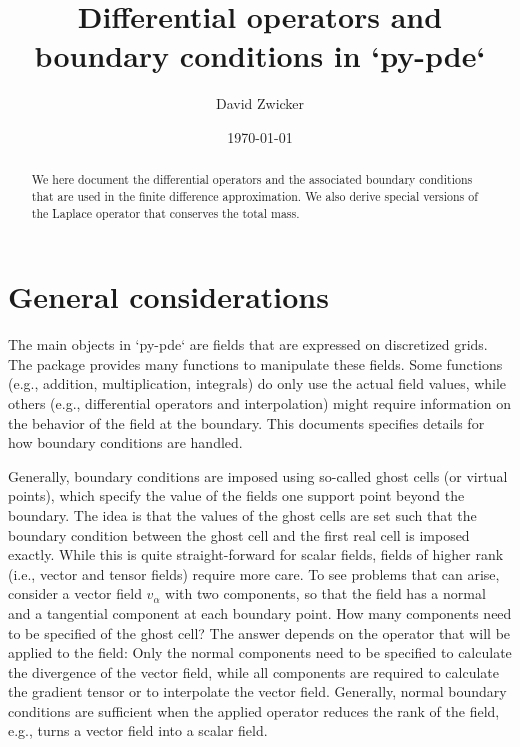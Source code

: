 \documentclass[
	superscriptaddress,
	twocolumn,
	aps, pre
]{revtex4-1}
\begin{document}
\title{Differential operators and boundary conditions in `py-pde`}
\author{David Zwicker}
\date{\today}

\begin{abstract}
We here document the differential operators and the associated boundary conditions that are used in the finite difference approximation.
We also derive special versions of the Laplace operator that conserves the total mass.
\end{abstract}


\maketitle
\tableofcontents


\section{General considerations}
The main objects in `py-pde` are fields that are expressed on discretized grids.
The package provides many functions to manipulate these fields.
Some functions (e.g., addition, multiplication, integrals) do only use the actual field values, while others (e.g., differential operators and interpolation) might require information on the behavior of the field at the boundary.
This documents specifies details for how boundary conditions are handled.

Generally, boundary conditions are imposed using so-called ghost cells (or virtual points), which specify the value of the fields one support point beyond the boundary.
The idea is that the values of the ghost cells are set such that the boundary condition between the ghost cell and the first real cell is imposed exactly.
While this is quite straight-forward for scalar fields, fields of higher rank (i.e., vector and tensor fields) require more care.
To see problems that can arise, consider a vector field $v_\alpha$ with two components, so that the field has a normal and a tangential component at each boundary point.
How many components need to be specified of the ghost cell? The answer depends on the operator that will be applied to the field: Only the normal components need to be specified to calculate the divergence of the vector field, while all components are required to calculate the gradient tensor or to interpolate the vector field.
Generally, normal boundary conditions are sufficient when the applied operator reduces the rank of the field, e.g., turns a vector field into a scalar field.
\end{document}
